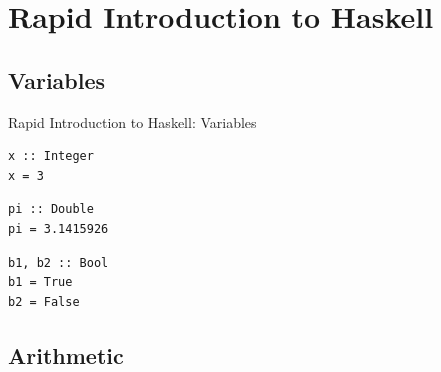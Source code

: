 \documentclass[8pt,aspectratio=169]{beamer}
\begin{document}
\section{Rapid Introduction to Haskell}


\subsection{Variables}


\begin{frame}[fragile]{Rapid Introduction to Haskell: Variables}

\pause
\begin{verbatim}
x :: Integer
x = 3
\end{verbatim}

\pause
\begin{verbatim}
pi :: Double
pi = 3.1415926
\end{verbatim}

\pause
\begin{verbatim}
b1, b2 :: Bool
b1 = True
b2 = False
\end{verbatim}

\end{frame}


\subsection{Arithmetic}

\end{document}
